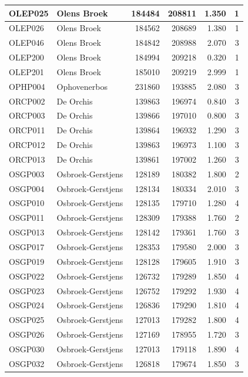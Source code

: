 \documentclass[11pt,]{book}
\begin{document}
\begin{table}
\begin{tabular}[t]{l|l|r|r|r|r}
\hline
OLEP025 & Olens Broek & 184484 & 208811 & 1.350 & 1\\
\hline
OLEP026 & Olens Broek & 184562 & 208689 & 1.380 & 1\\
\hline
OLEP046 & Olens Broek & 184842 & 208988 & 2.070 & 3\\
\hline
OLEP200 & Olens Broek & 184994 & 209218 & 0.320 & 1\\
\hline
OLEP201 & Olens Broek & 185010 & 209219 & 2.999 & 1\\
\hline
OPHP004 & Ophovenerbos & 231860 & 193885 & 2.080 & 3\\
\hline
ORCP002 & De Orchis & 139863 & 196974 & 0.840 & 3\\
\hline
ORCP003 & De Orchis & 139866 & 197010 & 0.800 & 3\\
\hline
ORCP011 & De Orchis & 139864 & 196932 & 1.290 & 3\\
\hline
ORCP012 & De Orchis & 139863 & 196973 & 1.100 & 3\\
\hline
ORCP013 & De Orchis & 139861 & 197002 & 1.260 & 3\\
\hline
OSGP003 & Osbroek-Gerstjens & 128189 & 180382 & 1.800 & 2\\
\hline
OSGP004 & Osbroek-Gerstjens & 128134 & 180334 & 2.010 & 3\\
\hline
OSGP010 & Osbroek-Gerstjens & 128135 & 179710 & 1.280 & 4\\
\hline
OSGP011 & Osbroek-Gerstjens & 128309 & 179388 & 1.760 & 2\\
\hline
OSGP013 & Osbroek-Gerstjens & 128142 & 179361 & 1.760 & 3\\
\hline
OSGP017 & Osbroek-Gerstjens & 128353 & 179580 & 2.000 & 3\\
\hline
OSGP019 & Osbroek-Gerstjens & 128128 & 179605 & 1.910 & 3\\
\hline
OSGP022 & Osbroek-Gerstjens & 126732 & 179289 & 1.850 & 4\\
\hline
OSGP023 & Osbroek-Gerstjens & 126752 & 179292 & 1.930 & 4\\
\hline
OSGP024 & Osbroek-Gerstjens & 126836 & 179290 & 1.810 & 4\\
\hline
OSGP025 & Osbroek-Gerstjens & 127013 & 179282 & 1.800 & 4\\
\hline
OSGP026 & Osbroek-Gerstjens & 127169 & 178955 & 1.720 & 3\\
\hline
OSGP030 & Osbroek-Gerstjens & 127013 & 179118 & 1.890 & 4\\
\hline
OSGP032 & Osbroek-Gerstjens & 126818 & 179674 & 1.850 & 3\\

\end{tabular}
\end{table}
\end{document}
